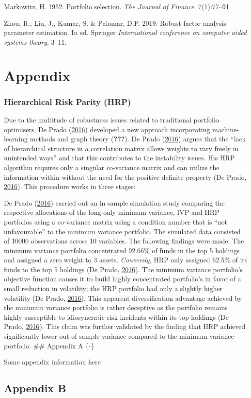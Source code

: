 \documentclass[11pt,preprint, authoryear]{elsarticle}
\numberwithin{equation}{section}
\numberwithin{figure}{section}
\numberwithin{table}{section}
\begin{document}
\leavevmode\hypertarget{ref-markowitz}{}%
Markowitz, H. 1952. Portfolio selection. \emph{The Journal of Finance}.
7(1):77--91.

\leavevmode\hypertarget{ref-zhou2019}{}%
Zhou, R., Liu, J., Kumar, S. \& Palomar, D.P. 2019. Robust factor
analysis parameter estimation. In ed. Springer \emph{International
conference on computer aided systems theory}. 3--11.

\newpage

\hypertarget{appendix}{%
\section*{Appendix}\label{appendix}}

\hypertarget{hierarchical-risk-parity-hrp}{%
\subsubsection{Hierarchical Risk Parity
(HRP)}\label{hierarchical-risk-parity-hrp}}

Due to the multitude of robustness issues related to traditional
portfolio optimisers, De Prado (\protect\hyperlink{ref-lopez}{2016})
developed a new approach incorporating machine-learning methods and
graph theory ({\textbf{???}}). De Prado
(\protect\hyperlink{ref-lopez}{2016}) argues that the ``lack of
hierarchical structure in a correlation matrix allows weights to vary
freely in unintended ways'' and that this contributes to the instability
issues. His HRP algorithm requires only a singular co-variance matrix
and can utilize the information within without the need for the positive
definite property (De Prado, \protect\hyperlink{ref-lopez}{2016}). This
procedure works in three stages:

De Prado (\protect\hyperlink{ref-lopez}{2016}) carried out an in sample
simulation study comparing the respective allocations of the long-only
minimum variance, IVP and HRP portfolios using a co-variance matrix
using a condition number that is ``not unfavourable'' to the minimum
variance portfolio. The simulated data consisted of 10000 observations
across 10 variables. The following findings were made: The minimum
variance portfolio concentrated 92.66\% of funds in the top 5 holdings
and assigned a zero weight to 3 assets. \emph{Conversly}, HRP only
assigned 62.5\% of its funds to the top 5 holdings (De Prado,
\protect\hyperlink{ref-lopez}{2016}). The minimum variance portfolio's
objective function causes it to build highly concentrated portfolio's in
favor of a small reduction in volatility; the HRP portfolio had only a
slightly higher volatility (De Prado,
\protect\hyperlink{ref-lopez}{2016}). This apparent diversification
advantage achieved by the minimum variance portfolio is rather deceptive
as the portfolio remains highly susceptible to idiosyncratic risk
incidents within its top holdings (De Prado,
\protect\hyperlink{ref-lopez}{2016}). This claim was further validated
by the finding that HRP achieved significantly lower out of sample
variance compared to the minimum variance portfolio. \#\# Appendix A
\{-\}

Some appendix information here

\hypertarget{appendix-b}{%
\subsection*{Appendix B}\label{appendix-b}}


\end{document}
